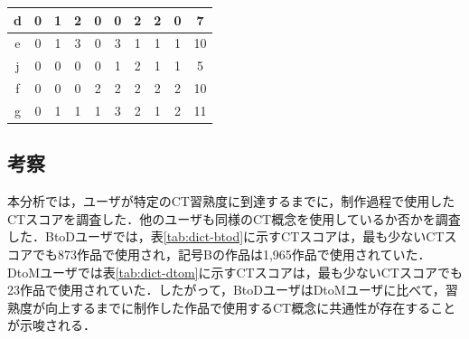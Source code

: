 \documentclass[submit,ses,noauthor]{ipsj}
\begin{document}
\begin{table}[t]
\begin{minipage}[t]{0.55\linewidth}
{\begin{tabular}{c|c|cccccccc}
\rowcolor{blue!30}%
d                   & 0                                           & \multicolumn{1}{c|}{1} & \multicolumn{1}{c|}{2} & \multicolumn{1}{c|}{0} & \multicolumn{1}{c|}{0} & \multicolumn{1}{c|}{2} & \multicolumn{1}{c|}{2} & \multicolumn{1}{c|}{0} & 7  \\ \hline
e                   & 0                                           & \multicolumn{1}{c|}{1} & \multicolumn{1}{c|}{3} & \multicolumn{1}{c|}{0} & \multicolumn{1}{c|}{3} & \multicolumn{1}{c|}{1} & \multicolumn{1}{c|}{1} & \multicolumn{1}{c|}{1} & 10  \\ \hline
j                   & 0                                           & \multicolumn{1}{c|}{0} & \multicolumn{1}{c|}{0} & \multicolumn{1}{c|}{0} & \multicolumn{1}{c|}{1} & \multicolumn{1}{c|}{2} & \multicolumn{1}{c|}{1} & \multicolumn{1}{c|}{1} & 5  \\ \hline
\rowcolor{blue!30}%
f                   & 0                                           & \multicolumn{1}{c|}{0} & \multicolumn{1}{c|}{0} & \multicolumn{1}{c|}{2} & \multicolumn{1}{c|}{2} & \multicolumn{1}{c|}{2} & \multicolumn{1}{c|}{2} & \multicolumn{1}{c|}{2} & 10  \\ \hline
\rowcolor{blue!30}%
g                   & 0                                           & \multicolumn{1}{c|}{1} & \multicolumn{1}{c|}{1} & \multicolumn{1}{c|}{1} & \multicolumn{1}{c|}{3} & \multicolumn{1}{c|}{2} & \multicolumn{1}{c|}{1} & \multicolumn{1}{c|}{2} & 11 \\ \hline
\end{tabular}
}
  \end{minipage}
  \vspace{-4mm}
\end{table}

\vspace{-2mm}
\subsection{考察}
本分析では，ユーザが特定のCT習熟度に到達するまでに，制作過程で使用したCTスコアを調査した．他のユーザも同様のCT概念を使用しているか否かを調査した．BtoDユーザでは，表\ref{tab:dict-btod}に示すCTスコアは，最も少ないCTスコアでも873作品で使用され，記号Bの作品は1,965作品で使用されていた．DtoMユーザでは表\ref{tab:dict-dtom}に示すCTスコアは，最も少ないCTスコアでも23作品で使用されていた．したがって，BtoDユーザはDtoMユーザに比べて，習熟度が向上するまでに制作した作品で使用するCT概念に共通性が存在することが示唆される．
\end{document}

